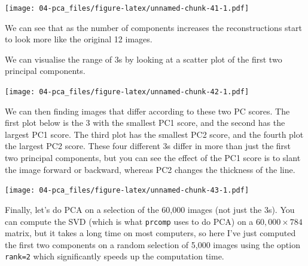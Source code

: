 \documentclass[
]{book}
\newenvironment{Shaded}{\begin{snugshade}}{\end{snugshade}}
\newcommand{\CommentTok}[1]{\textcolor[rgb]{0.56,0.35,0.01}{\textit{#1}}}
\newcommand{\DecValTok}[1]{\textcolor[rgb]{0.00,0.00,0.81}{#1}}
\newcommand{\FunctionTok}[1]{\textcolor[rgb]{0.13,0.29,0.53}{\textbf{#1}}}
\newcommand{\NormalTok}[1]{#1}
\newcommand{\OtherTok}[1]{\textcolor[rgb]{0.56,0.35,0.01}{#1}}
\newcommand{\SpecialCharTok}[1]{\textcolor[rgb]{0.81,0.36,0.00}{\textbf{#1}}}
\theoremstyle{definition}
\theoremstyle{definition}
\theoremstyle{definition}
\theoremstyle{definition}
\theoremstyle{remark}
\begin{document}
\texttt{[image: 04-pca\_files/figure-latex/unnamed-chunk-41-1.pdf]}

We can see that as the number of components increases the reconstructions start to look more like the original 12 images.

We can visualise the range of 3s by looking at a scatter plot of the first two principal components.

\begin{Shaded}
\end{Shaded}

\texttt{[image: 04-pca\_files/figure-latex/unnamed-chunk-42-1.pdf]}

We can then finding images that differ according to these two PC scores. The first plot below is the 3 with the smallest PC1 score, and the second has the largest PC1 score. The third plot has the smallest PC2 score, and the fourth plot the largest PC2 score.
These four different 3s differ in more than just the first two principal components, but you can see the effect of the PC1 score is to slant the image forward or backward, whereas PC2 changes the thickness of the line.

\begin{Shaded}
\end{Shaded}

\texttt{[image: 04-pca\_files/figure-latex/unnamed-chunk-43-1.pdf]}

Finally, let's do PCA on a selection of the 60,000 images (not just the 3s). You can compute the SVD (which is what \texttt{prcomp} uses to do PCA) on a \(60,000 \times 784\) matrix, but it takes a long time on most computers, so here I've just computed the first two components on a random selection of 5,000 images using the option \texttt{rank=2} which significantly speeds up the computation time.
\end{document}

